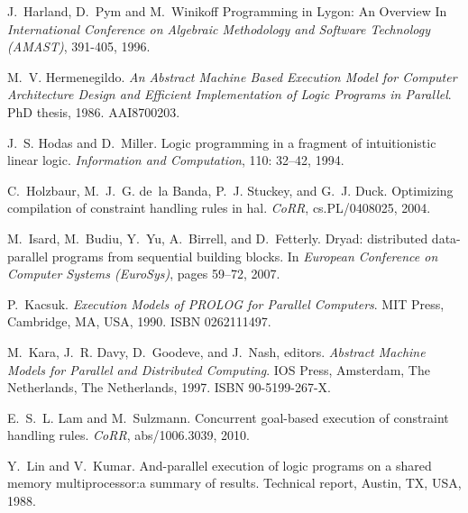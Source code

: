 \documentclass{sigplanconf}
\begin{document}
\begin{thebibliography}{35}
J.~Harland, D.~Pym and M.~Winikoff
\newblock Programming in Lygon: An Overview
\newblock In \emph{International Conference on Algebraic Methodology and Software Technology (AMAST)}, 391-405,  1996.

M.~V. Hermenegildo.
\newblock \emph{An Abstract Machine Based Execution Model for Computer
  Architecture Design and Efficient Implementation of Logic Programs in
  Parallel}.
\newblock PhD thesis, 1986.
\newblock AAI8700203.

J.~S. Hodas and D.~Miller.
\newblock Logic programming in a fragment of intuitionistic linear logic.
\newblock \emph{Information and Computation}, 110: 32--42, 1994.

C.~Holzbaur, M.~J.~G. de~la Banda, P.~J. Stuckey, and G.~J. Duck.
\newblock Optimizing compilation of constraint handling rules in hal.
\newblock \emph{CoRR}, cs.PL/0408025, 2004.

M.~Isard, M.~Budiu, Y.~Yu, A.~Birrell, and D.~Fetterly.
\newblock Dryad: distributed data-parallel programs from sequential building
  blocks.
\newblock In \emph{European Conference on Computer Systems (EuroSys)}, pages
  59--72, 2007.

P.~Kacsuk.
\newblock \emph{Execution Models of PROLOG for Parallel Computers}.
\newblock MIT Press, Cambridge, MA, USA, 1990.
\newblock ISBN 0262111497.

M.~Kara, J.~R. Davy, D.~Goodeve, and J.~Nash, editors.
\newblock \emph{Abstract Machine Models for Parallel and Distributed
  Computing}.
\newblock IOS Press, Amsterdam, The Netherlands, The Netherlands, 1997.
\newblock ISBN 90-5199-267-X.

E.~S.~L. Lam and M.~Sulzmann.
\newblock Concurrent goal-based execution of constraint handling rules.
\newblock \emph{CoRR}, abs/1006.3039, 2010.

Y.~Lin and V.~Kumar.
\newblock And-parallel execution of logic programs on a shared memory
  multiprocessor:a summary of results.
\newblock Technical report, Austin, TX, USA, 1988.


\end{thebibliography}
\end{document}
